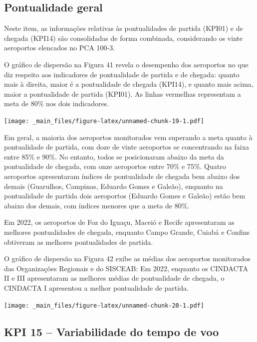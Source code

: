 \documentclass[
]{book}
\begin{document}
\hypertarget{pontualidade-geral}{%
\subsection{Pontualidade geral}\label{pontualidade-geral}}

Neste item, as informações relativas às pontualidades de partida (KPI01) e de chegada (KPI14) são consolidadas de forma combinada, considerando os vinte aeroportos elencados no PCA 100-3.

O gráfico de dispersão na Figura 41 revela o desempenho dos aeroportos no que diz respeito aos indicadores de pontualidade de partida e de chegada: quanto mais à direita, maior é a pontualidade de chegada (KPI14), e quanto mais acima, maior a pontualidade de partida (KPI01). As linhas vermelhas representam a meta de 80\% nos dois indicadores.

\texttt{[image: \_main\_files/figure-latex/unnamed-chunk-19-1.pdf]}

Em geral, a maioria dos aeroportos monitorados vem superando a meta quanto à pontualidade de partida, com doze de vinte aeroportos se concentrando na faixa entre 85\% e 90\%. No entanto, todos se posicionaram abaixo da meta da pontualidade de chegada, com onze aeroportos entre 70\% e 75\%. Quatro aeroportos apresentaram índices de pontualidade de chegada bem abaixo dos demais (Guarulhos, Campinas, Eduardo Gomes e Galeão), enquanto na pontualidade de partida dois aeroportos (Eduardo Gomes e Galeão) estão bem abaixo dos demais, com índices menores que a meta de 80\%.

Em 2022, os aeroportos de Foz do Iguaçu, Maceió e Recife apresentaram as melhores pontualidades de chegada, enquanto Campo Grande, Cuiabá e Confins obtiveram as melhores pontualidades de partida.

O gráfico de dispersão na Figura 42 exibe as médias dos aeroportos monitorados das Organizações Regionais e do SISCEAB: Em 2022, enquanto os CINDACTA II e III apresentaram as melhores médias de pontualidade de chegada, o CINDACTA I apresentou a melhor pontualidade de partida.

\texttt{[image: \_main\_files/figure-latex/unnamed-chunk-20-1.pdf]}

\hypertarget{kpi-15-variabilidade-do-tempo-de-voo}{%
\subsection{KPI 15 -- Variabilidade do tempo de voo}\label{kpi-15-variabilidade-do-tempo-de-voo}}
\end{document}
